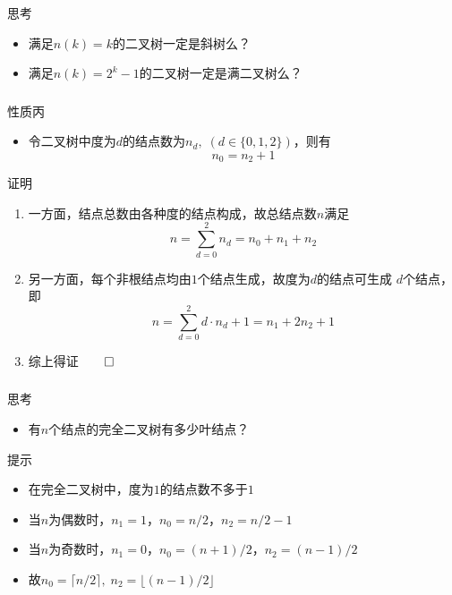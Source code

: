 \begin{frame}
    \frametitle{\insertsubsectionhead}
    \begin{alertblock}{思考}
        \begin{itemize}
            \item 满足$n(k)=k$的二叉树一定是斜树么？
            \item 满足$n(k)=2^{k}-1$的二叉树一定是满二叉树么？
        \end{itemize}
    \end{alertblock}
\end{frame}

\begin{frame}
    \frametitle{\insertsubsectionhead}
    \begin{block}{性质丙}
        \begin{itemize}
            \item 令二叉树中度为$d$的结点数为$n_{d},\;(d\in\{0,1,2\})$，则有
                  \[
                        n_{0}=n_{2}+1
                  \]
        \end{itemize}
    \end{block}
    \pause
    \begin{exampleblock}{证明}
        \begin{enumerate}
            \item 一方面，结点总数由各种度的结点构成，故总结点数$n$满足
                  \[
                        n=\sum_{d=0}^{2}{n_{d}}=n_{0}+n_{1}+n_{2}
                  \]
            \item 另一方面，每个非根结点均由$1$个结点生成，故度为$d$的结点可生成
                  $d$个结点，即
                  \[
                        n=\sum_{d=0}^{2}{d\cdot{}n_{d}}+1=n_{1}+2n_{2}+1
                  \]
            \item 综上得证\hfill$\qed$
        \end{enumerate}
    \end{exampleblock}
\end{frame}

\begin{frame}
    \frametitle{\insertsubsectionhead}
    \begin{alertblock}{思考}
        \begin{itemize}
            \item 有$n$个结点的完全二叉树有多少叶结点？
        \end{itemize}
    \end{alertblock}
    \pause
    \begin{exampleblock}{提示}
        \begin{itemize}
            \item 在完全二叉树中，度为$1$的结点数不多于$1$
            \item 当$n$为偶数时，$n_{1}=1$，$n_{0}=n/2$，$n_{2}=n/2-1$
            \item 当$n$为奇数时，$n_{1}=0$，$n_{0}=(n+1)/2$，$n_{2}=(n-1)/2$
            \item 故$n_{0}=\lceil{n/2}\rceil,\;n_{2}=\lfloor{(n-1)/2}\rfloor$
        \end{itemize}
    \end{exampleblock}
\end{frame}

